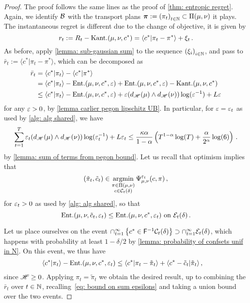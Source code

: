 \begin{proof}
    The proof follows the same lines as the proof of \cref{thm: entropic regret}. Again, we identify $\mathcal{B}$ with the transport plans $\bm{\pi}:={(\pi_t)}_{t\in\mathbb{N}}\subset\Pi(\mu,\nu)$ it plays. The instantaneous regret is different due to the change of objective, it is given by 
    \[
        r_t:= R_t - \text{Kant.}(\mu,\nu,c^*) = \langle c^*\vert \pi_t-\pi^*\rangle +\xi_t\,.
    \]
    As before, apply \cref{lemma: sub-gaussian sum} to the sequence ${(\xi_i)}_{i\in\mathbb{N}}$, and pass to $\bar r_t := \langle c^*\vert \pi_t-\pi^*\rangle$, which can be decomposed as
    \begin{align}
        \bar r_t &= \langle c^*\vert \pi_t\rangle - \langle c^*\vert \pi^*\rangle\notag\\
        &= \langle c^*\vert \pi_t\rangle  - \text{Ent.}(\mu,\nu,c^*,\varepsilon)+\text{Ent.}(\mu,\nu,c^*,\varepsilon) - \text{Kant.}(\mu,\nu,c^*)\notag\\
        &\le \langle c^*\vert \pi_t\rangle -\text{Ent.}(\mu,\nu,c^*,\varepsilon) + \varepsilon (d_{\mathscr{H}}(\mu)\wedge d_{\mathscr{H}}(\nu))\log(\varepsilon^{-1}) + L\varepsilon\notag
    \end{align}
    for any $\varepsilon>0$, by \cref{lemma carlier pegon lipschitz UB}. In particular, for $\varepsilon=\varepsilon_t$ as used by \cref{alg: alg shared}, we have
    \begin{align}
        \sum_{t=1}^T \varepsilon_t(d_{\mathscr{H}}(\mu)\wedge d_{\mathscr{H}}(\nu))\log(\varepsilon_t^{-1}) + L\varepsilon_t \le \frac{\kappa\alpha}{1-\alpha}\left(T^{1-\alpha}\log(T) + \frac{\alpha}{2^\alpha}\log(6)\right)\,.\label{eq: bound on sum epsilons}
    \end{align}
    by \cref{lemma: sum of terms from pegon bound}.
    Let us recall that optimism implies that 
    \begin{align} 
        (\tilde\pi_t,\tilde c_t)\in\operatorname*{argmin}_{\substack{\pi\in\Pi(\mu,\nu)\\c\in\mathcal{C}_t(\delta)}} \Psi^{\varepsilon_t}_{\mu,\nu}(c,\pi)\notag\,,
    \end{align}
    for $\varepsilon_t>0$ as used by \cref{alg: alg shared}, so that 
    \[
    \text{Ent.}(\mu,\nu,\tilde c_t,\varepsilon_t)\le \text{Ent.}(\mu,\nu,c^*,\varepsilon_t) \mbox{ on } \mathcal{E}_t(\delta)\,.
    \]

    Let us place ourselves on the event $\cap_{t=1}^\infty\left\{c^*\in\mathsf{F}^{-1}\mathcal{C}_t(\delta)\right\}\supset \cap_{t=1}^\infty \mathcal{E}_t(\delta)$, which happens with probability at least $1-\delta/2$ by \cref{lemma: probability of confsets unif in N}.
   On this event, we thus have 
    \begin{align*}
        \langle c^*\vert \pi_t\rangle -\text{Ent.}(\mu,\nu,c^*,\varepsilon_t) &\le \langle c^*\vert \pi_t-\tilde\pi_t\rangle + \langle c^*-\tilde c_t\vert \tilde\pi_t\rangle\,,
    \end{align*}
    since $\mathscr{H}\ge 0$.
    Applying $\pi_t=\tilde\pi_t$ we obtain the desired result, up to combining the $\bar r_t$ over $t\in\mathbb{N}$, recalling~\eqref{eq: bound on sum epsilons} and taking a union bound over the two events.
\end{proof}


